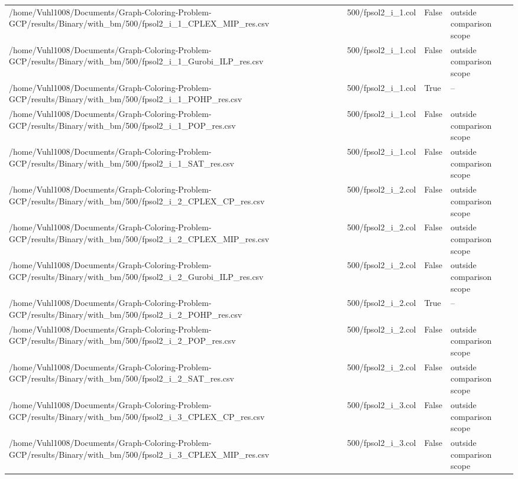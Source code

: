 \begin{table}[htbp]
\begin{tabular}{llll}
/home/Vuhl1008/Documents/Graph-Coloring-Problem-GCP/results/Binary/with\_bm/500/fpsol2\_i\_1\_CPLEX\_MIP\_res.csv & 500/fpsol2\_i\_1.col & False & outside comparison scope \\
/home/Vuhl1008/Documents/Graph-Coloring-Problem-GCP/results/Binary/with\_bm/500/fpsol2\_i\_1\_Gurobi\_ILP\_res.csv & 500/fpsol2\_i\_1.col & False & outside comparison scope \\
/home/Vuhl1008/Documents/Graph-Coloring-Problem-GCP/results/Binary/with\_bm/500/fpsol2\_i\_1\_POHP\_res.csv & 500/fpsol2\_i\_1.col & True & -- \\
/home/Vuhl1008/Documents/Graph-Coloring-Problem-GCP/results/Binary/with\_bm/500/fpsol2\_i\_1\_POP\_res.csv & 500/fpsol2\_i\_1.col & False & outside comparison scope \\
/home/Vuhl1008/Documents/Graph-Coloring-Problem-GCP/results/Binary/with\_bm/500/fpsol2\_i\_1\_SAT\_res.csv & 500/fpsol2\_i\_1.col & False & outside comparison scope \\
/home/Vuhl1008/Documents/Graph-Coloring-Problem-GCP/results/Binary/with\_bm/500/fpsol2\_i\_2\_CPLEX\_CP\_res.csv & 500/fpsol2\_i\_2.col & False & outside comparison scope \\
/home/Vuhl1008/Documents/Graph-Coloring-Problem-GCP/results/Binary/with\_bm/500/fpsol2\_i\_2\_CPLEX\_MIP\_res.csv & 500/fpsol2\_i\_2.col & False & outside comparison scope \\
/home/Vuhl1008/Documents/Graph-Coloring-Problem-GCP/results/Binary/with\_bm/500/fpsol2\_i\_2\_Gurobi\_ILP\_res.csv & 500/fpsol2\_i\_2.col & False & outside comparison scope \\
/home/Vuhl1008/Documents/Graph-Coloring-Problem-GCP/results/Binary/with\_bm/500/fpsol2\_i\_2\_POHP\_res.csv & 500/fpsol2\_i\_2.col & True & -- \\
/home/Vuhl1008/Documents/Graph-Coloring-Problem-GCP/results/Binary/with\_bm/500/fpsol2\_i\_2\_POP\_res.csv & 500/fpsol2\_i\_2.col & False & outside comparison scope \\
/home/Vuhl1008/Documents/Graph-Coloring-Problem-GCP/results/Binary/with\_bm/500/fpsol2\_i\_2\_SAT\_res.csv & 500/fpsol2\_i\_2.col & False & outside comparison scope \\
/home/Vuhl1008/Documents/Graph-Coloring-Problem-GCP/results/Binary/with\_bm/500/fpsol2\_i\_3\_CPLEX\_CP\_res.csv & 500/fpsol2\_i\_3.col & False & outside comparison scope \\
/home/Vuhl1008/Documents/Graph-Coloring-Problem-GCP/results/Binary/with\_bm/500/fpsol2\_i\_3\_CPLEX\_MIP\_res.csv & 500/fpsol2\_i\_3.col & False & outside comparison scope \\

\end{tabular}
\end{table}
